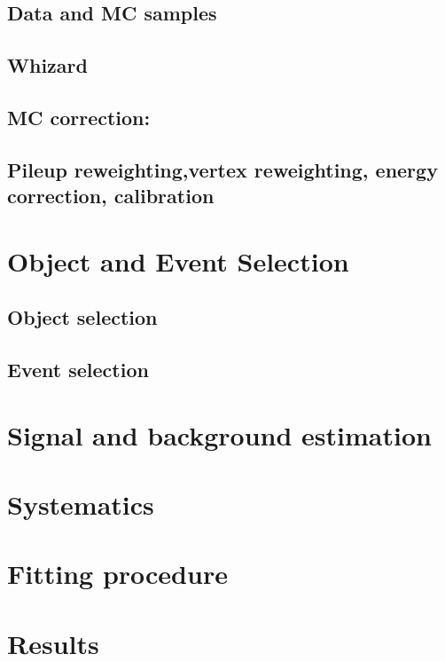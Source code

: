 \documentclass[12pt]{article}
\begin{document}
\begin{doublespacing}
\subsection{Data and MC samples}
\subsection{Whizard}
\subsection{MC correction:}
\subsection{Pileup reweighting,vertex reweighting, energy correction, calibration}
\section{Object and Event Selection}

\subsection{Object selection}



\subsection{Event selection}
\section{Signal and background estimation}




\section{Systematics}


\section{Fitting procedure}
\section{Results}
\end{doublespacing}
\end{document}
